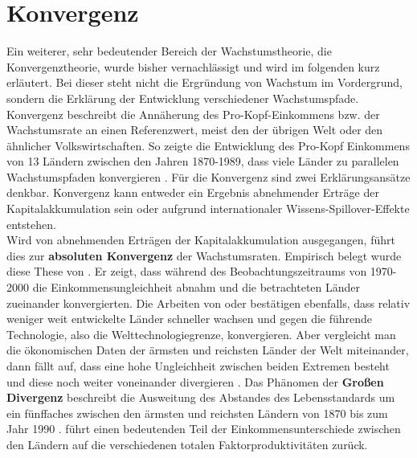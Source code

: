 \chapter{Konvergenz}
Ein weiterer, sehr bedeutender Bereich der Wachstumstheorie, die Konvergenztheorie, wurde bisher vernachlässigt und wird im folgenden kurz erläutert. Bei dieser steht nicht die Ergründung von Wachstum im Vordergrund, sondern die Erklärung der Entwicklung verschiedener Wachstumspfade.\\
%
Konvergenz beschreibt die Annäherung des Pro-Kopf-Einkommens bzw. der Wachstumsrate an einen Referenzwert, meist den der übrigen Welt oder den ähnlicher Volkswirtschaften. So zeigte die Entwicklung des Pro-Kopf Einkommens von 13 Ländern zwischen den Jahren 1870-1989, dass viele Länder zu parallelen Wachstumspfaden konvergieren \cite{Evans.1996}. Für die Konvergenz sind zwei Erklärungsansätze denkbar. Konvergenz kann entweder ein Ergebnis abnehmender Erträge der Kapitalakkumulation sein oder aufgrund internationaler Wissens-Spillover-Effekte entstehen. \\
%
Wird von abnehmenden Erträgen der Kapitalakkumulation ausgegangen, führt dies zur \textbf{absoluten Konvergenz} der Wachstumsraten. Empirisch belegt wurde diese These von \cite{SalaiMartin.2002}. Er zeigt, dass während des Beobachtungszeitraums von 1970-2000 die Einkommensungleichheit abnahm und die betrachteten Länder zueinander konvergierten. Die Arbeiten von \cite{Mankiw.1992} oder \cite{Barro.1997} bestätigen ebenfalls, dass relativ weniger weit entwickelte Länder schneller wachsen und gegen die führende Technologie, also die Welttechnologiegrenze, konvergieren.
Aber vergleicht man die ökonomischen Daten der ärmsten und reichsten Länder der Welt miteinander, dann fällt auf, dass eine hohe Ungleichheit zwischen beiden Extremen besteht und diese noch weiter voneinander divergieren \cite{Maddison.2001}. Das Phänomen der \textbf{Großen Divergenz} beschreibt die Ausweitung des Abstandes des Lebensstandards um ein fünffaches zwischen den ärmsten und reichsten Ländern von 1870  bis zum Jahr 1990 \cite{Pritchett.1997}. \cite{Helpman.2004} führt einen bedeutenden Teil der Einkommensunterschiede zwischen den Ländern auf die verschiedenen totalen Faktorproduktivitäten zurück.\\
%
